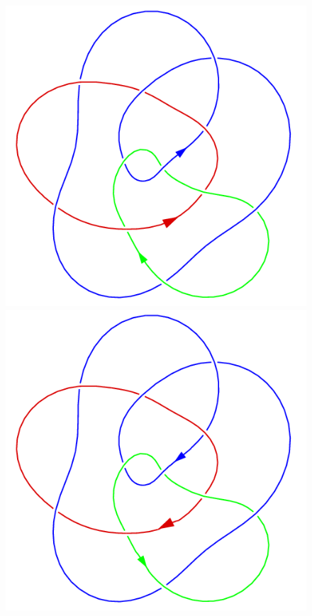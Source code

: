 \begin{definition}
\begin{figure}[H]
        \begin{minipage}[b]{.32\linewidth}
            \centering 
            \includegraphics[width=\linewidth]{../data/link.png} 
        \end{minipage}
        \begin{minipage}[b]{.32\linewidth}
            \centering 
            \includegraphics[width=\linewidth]{../data/link_reverse.png} 
        \end{minipage}
    \end{figure}
\end{definition}

